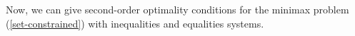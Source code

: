\documentclass[11pt]{article}
\numberwithin{equation}{section}
\begin{document}
{%

Now, we can give second-order optimality conditions for the minimax problem  (\ref{set-constrained}) with inequalities and equalities systems.


}
\end{document}
